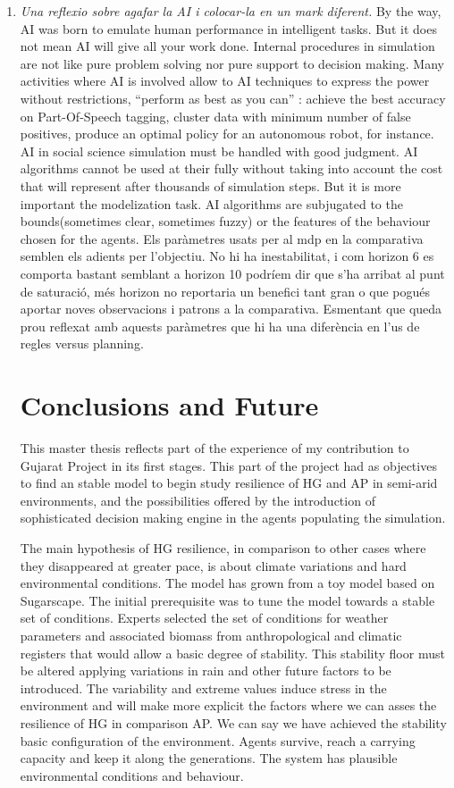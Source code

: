 \documentclass[11pt,oneside,a4paper,openright]{report}
\begin{document}
\begin{enumerate}
\item \textit{Una reflexio sobre agafar la AI i colocar-la en un mark diferent.}
	By the way, AI was born to emulate human performance in intelligent tasks. But it does not mean AI will give all your work done. Internal procedures in simulation are not like pure problem solving nor pure support to decision making. Many activities where AI is involved allow to AI techniques to express the power without restrictions, ``perform as best as you can'' : achieve the best accuracy on Part-Of-Speech tagging, cluster data with minimum number of false positives, produce an optimal policy for an autonomous robot, for instance. AI in social science simulation must be handled with good judgment. AI algorithms cannot be used at their fully without taking into account the cost that will represent after thousands of simulation steps. But it is more important the modelization task. AI algorithms are subjugated to the bounds(sometimes clear, sometimes fuzzy) or the features of the behaviour chosen for the agents. 
Els paràmetres usats per al mdp en la comparativa semblen els adients per l'objectiu. No hi ha inestabilitat, 
i com horizon 6 es comporta bastant semblant a horizon 10 podríem dir que s'ha arribat al punt de saturació,
més horizon no reportaria un benefici tant gran o que pogués aportar noves observacions i patrons a la 
comparativa. Esmentant que queda prou reflexat amb aquests paràmetres que hi ha una diferència en l'us de regles versus 
planning.




\chapter{Conclusions and Future}

This master thesis reflects part of the experience of my contribution to Gujarat Project in
its first stages. This part of the project had as objectives to find an stable model to begin
study resilience of HG and AP in semi-arid environments, and the possibilities offered by the
introduction of sophisticated decision making engine in the agents populating the simulation.

The main hypothesis of HG resilience, in comparison to other cases where they disappeared at 
greater pace, is about climate variations and hard environmental conditions.
The model has grown from a toy model based on Sugarscape\cite{EpsteinAxtell}. The initial prerequisite
was to tune the model towards a stable set of conditions. Experts selected the set of conditions 
for weather parameters and associated biomass from anthropological and climatic registers that would 
allow a basic degree of stability. This stability floor must be altered applying variations in rain and
other future factors to be introduced. The variability and extreme values induce stress in the 
environment and will make more explicit the factors where we can asses the resilience of HG in comparison AP. We 
can say we have achieved the stability basic configuration of the environment. Agents survive, reach a carrying capacity and keep it along the generations. The system has plausible environmental conditions and behaviour.


\end{enumerate}
\end{document}
